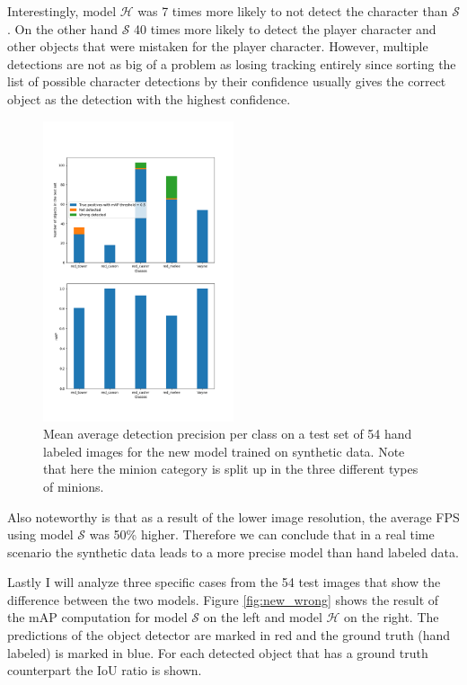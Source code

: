 Interestingly, model $\mathcal{H}$ was 7 times more likely to not detect the character than $\mathcal{S}$.
On the other hand $\mathcal{S}$ 40 times more likely to detect the player character and other objects that were mistaken for the player character.
However, multiple detections are not as big of a problem as losing tracking entirely since sorting the list of possible character detections by their confidence usually gives the correct object as the detection with the highest confidence.
\begin{figure}[H]
\includegraphics[width=0.5\textwidth]{figures/new_05_02_final.png}
\caption{Mean average detection precision per class on a test set of 54 hand labeled images for the new model trained on synthetic data. Note that here the minion category is split up in the three different types of minions.}
\label{fig:results_new}
\end{figure}
Also noteworthy is that as a result of the lower image resolution, the average FPS using model $\mathcal{S}$ was 50\% higher.
Therefore we can conclude that in a real time scenario the synthetic data leads to a more precise model than hand labeled data.

Lastly I will analyze three specific cases from the 54 test images that show the difference between the two models.
Figure \ref{fig:new_wrong} shows the result of the mAP computation for model $\mathcal{S}$ on the left and model $\mathcal{H}$ on the right.
The predictions of the object detector are marked in red and the ground truth (hand labeled) is marked in blue.
For each detected object that has a ground truth counterpart the IoU ratio is shown.

